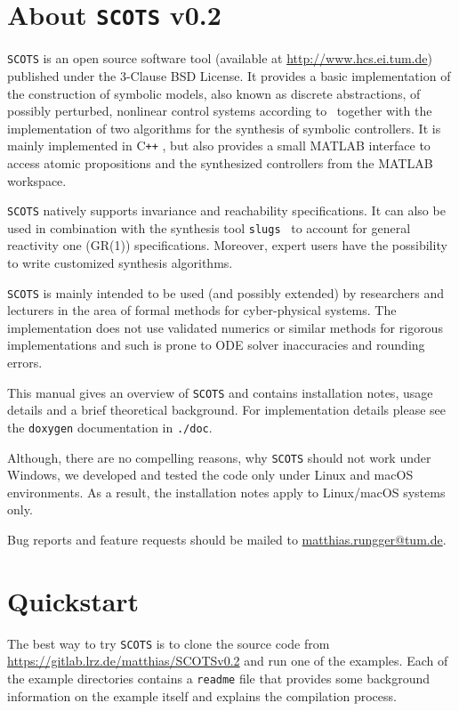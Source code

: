 \documentclass[a4paper]{amsart}
\newcommand\Cpp{C\texttt{++} }
\begin{document}
\newpage


\section{About {\tt SCOTS} v0.2}

{\tt SCOTS} is an open source software tool (available at
\mbox{\url{http://www.hcs.ei.tum.de}}) published under the 3-Clause BSD License. It
provides a basic implementation of the construction of symbolic models, also
known as discrete abstractions, of possibly perturbed, nonlinear control systems
according to~\cite{ReissigWeberRungger15} together with the implementation of
two algorithms for the synthesis of symbolic controllers. It is mainly implemented
in \Cpp, but also provides a small MATLAB interface to access atomic propositions
and the synthesized controllers from the MATLAB workspace.

{\tt SCOTS} natively supports invariance and reachability
specifications. 
It can also be used in
combination with the synthesis tool {\tt slugs}~\cite{EhlersRaman16} to account for
general reactivity one (GR(1)) specifications. Moreover, expert users have the
possibility to write customized synthesis algorithms.

{\tt SCOTS} is mainly intended to be used (and possibly extended) by researchers and
lecturers in the area of formal methods for
cyber-physical systems. The implementation does not use validated numerics or similar
methods for rigorous implementations and such is prone to ODE solver
inaccuracies and rounding errors.

This manual gives an overview of {\tt SCOTS} and contains installation
notes, usage details and a brief theoretical background. For implementation
details please see the {\tt doxygen} documentation in {\tt ./doc}.

Although, there are no compelling reasons, why {\tt SCOTS} should not work
under Windows, we developed and tested the code only under Linux and macOS
environments. As a result, the installation notes apply to
Linux/macOS systems only. 



Bug reports and feature requests should be mailed to \href{mailto:matthias.rungger@tum.de}{matthias.rungger@tum.de}. 

\section{Quickstart}

The best way to try {\tt SCOTS} is to clone the source code from
\url{https://gitlab.lrz.de/matthias/SCOTSv0.2} and run one of the examples. Each of the
example directories contains a {\tt readme} file that provides some background
information on the example itself and explains the compilation
process. 
\end{document}
